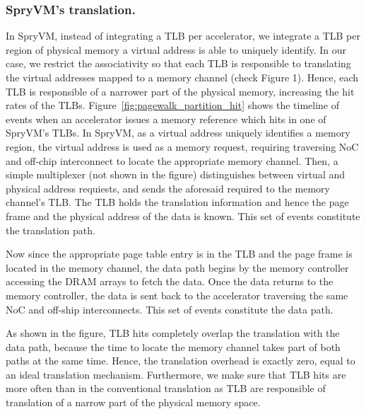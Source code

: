 \subsubsection{SpryVM's translation.}

In SpryVM, instead of integrating a TLB per accelerator, we integrate a TLB per region of physical memory a virtual address is able to uniquely identify. In our case, we restrict the associativity so that each TLB is responsible to translating the virtual addresses mapped to a memory channel (check Figure 1). Hence, each TLB is responsible of a narrower part of the physical memory, increasing the hit rates of the TLBs. Figure~\ref{fig:pagewalk_partition_hit} shows the timeline of events when an accelerator issues a memory reference which hits in one of SpryVM's TLBs. In SpryVM, as a virtual address uniquely identifies a memory region, the virtual address is used as a memory request, requiring traversing NoC and off-chip interconnect to locate the appropriate memory channel. Then, a simple multiplexer (not shown in the figure) distinguishes between virtual and physical address requiests, and sends the aforesaid required to the memory channel's TLB. The TLB holds the translation information and hence the page frame and the physical address of the data is known. This set of events constitute the translation path. 

Now since the appropriate page table entry is in the TLB and the page frame is located in the memory channel, the data path begins by the memory controller accessing the DRAM arrays to fetch the data. Once the data returns to the memory controller, the data is sent back to the accelerator traversing the same NoC and off-ship interconnects. This set of events constitute the data path.

As shown in the figure, TLB hits completely overlap the translation with the data path, because the time to locate the memory channel takes part of both paths at the same time. Hence, the translation overhead is exactly zero, equal to an ideal translation mechanism. Furthermore, we make sure that TLB hits are more often than in the conventional translation as TLB are responsible of translation of a narrow part of the physical memory space.

